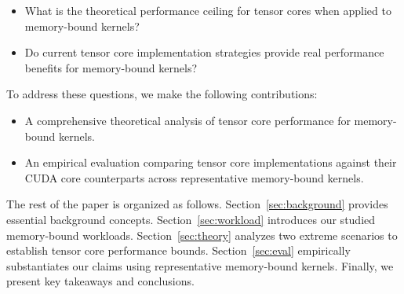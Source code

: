 
\begin{itemize}
\item What is the theoretical performance ceiling for tensor cores when applied to memory-bound kernels?
\item Do current tensor core implementation strategies provide real performance benefits for memory-bound kernels?

\end{itemize}
To address these questions, we make the following contributions:
\begin{itemize}
\item A comprehensive theoretical analysis of tensor core performance for memory-bound kernels.
\item An empirical evaluation comparing tensor core implementations against their CUDA core counterparts across representative memory-bound kernels.
\end{itemize}


The rest of the paper is organized as follows. Section~\ref{sec:background} provides essential background concepts. Section~\ref{sec:workload} introduces our studied memory-bound workloads. Section~\ref{sec:theory} analyzes two extreme scenarios to establish tensor core performance bounds. Section~\ref{sec:eval} empirically substantiates our claims using representative memory-bound kernels. Finally, we present key takeaways and conclusions.


